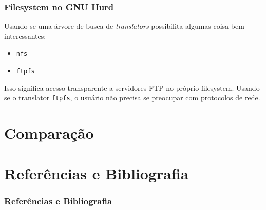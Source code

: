 \documentclass[10pt]{beamer}
\theoremstyle{plain}
\newcommand{\code}[1]{\lstinline[mathescape=true]{#1}}
\begin{document}
\begin{frame}
  \frametitle{Filesystem no GNU Hurd}

  Usando-se uma árvore de busca de \textit{translators} possibilita algumas coisa bem
  interessantes:

  \begin{itemize}
    \item \code{nfs}
    \item \code{ftpfs}
  \end{itemize}

  Isso significa acesso transparente a servidores FTP no próprio filesystem. Usando-se o translator
  \code{ftpfs}, o usuário não precisa se preocupar com protocolos de rede.
\end{frame}

\section{Comparação}


\section[Referências]{Referências e Bibliografia}
\begin{frame}[t,allowframebreaks]
  \frametitle{Referências e Bibliografia}
  \footnotesize
  \nocite{*}
  \printbibliography[]
\end{frame}
\end{document}
